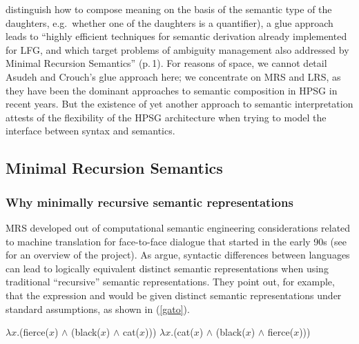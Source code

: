 \documentclass[output=paper
 	        ,biblatex
                ,babelshorthands
                ,newtxmath
                ,draftmode
                ,colorlinks, citecolor=brown
]{langscibook}
\begin{document}
 distinguish how to compose meaning on the basis of the semantic type of the daughters, e.g.\ whether one of the daughters is a quantifier), a glue approach leads to ``highly efficient techniques for semantic derivation already implemented for LFG, and which target problems of ambiguity management also addressed by Minimal Recursion Semantics'' (p.\,1). For reasons of space, we cannot detail Asudeh and Crouch's glue approach here; we concentrate on MRS and LRS, as they have been the dominant approaches to semantic composition in HPSG in recent years. But the existence of yet another approach to semantic interpretation attests of the flexibility of the HPSG architecture when trying to model the interface between syntax and semantics.


\subsection{Minimal Recursion Semantics}
\label{sec-minimal-recursion-semantics}\label{semantics:sec-mrs}

\subsubsection{Why minimally recursive semantic representations}

MRS developed out of computational semantic engineering considerations related to machine translation for face-to-face dialogue that started in the early 90s (see \citealt{Kayetal1992} for an overview of the \verbmobil project). As \citet{Copestakeetal1995} argue, syntactic differences between languages can lead to logically equivalent distinct semantic representations when using traditional ``recursive'' semantic representations. They point out, for example, that the  expression  and   would be given distinct semantic representations under standard assumptions, as shown in (\ref{gato}).

\begin{exe}
\ex\label{gato}
\begin{xlist}
\ex\label{gatoa}
$\lambda x$.(fierce($x$) $\wedge$ (black($x$) $\wedge$ cat($x$)))
\ex\label{gatob}
$\lambda x$.(cat($x$) $\wedge$ (black($x$) $\wedge$ fierce($x$)))
\end{xlist}
\end{exe}
\end{document}
